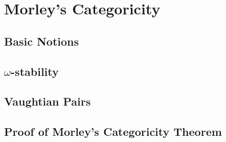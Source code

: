 \documentclass[10pt]{report}
\begin{document}






\chapter{Morley's Categoricity}

\section{Basic Notions}


\section{\(\omega\)-stability}


\section{Vaughtian Pairs}


\section{Proof of Morley's Categoricity Theorem}


%
\end{document}
